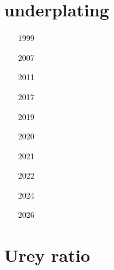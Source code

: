\section{underplating}

\begin{small}
\begin{itemize}
\item[1999] 
\item[2007] 
\item[2011] 
\item[2017] 
\item[2019] 
\item[2020] 
\item[2021] 
\item[2022] 
\item[2024] 
\item[2026]  
\end{itemize}
\end{small}


\section{Urey ratio}

\begin{small}
\begin{itemize}
\item[\twothousandeight] 
\item[\twothousandtwelve] 
\end{itemize}
\end{small}










